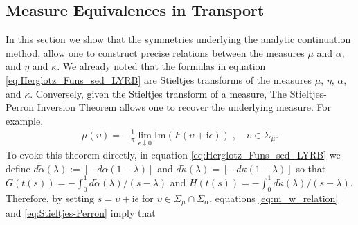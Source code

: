 \documentclass[english,12pt,jmp,graphicx]{revtex4-1}
\newcommand{\I}{\mathrm{i}}
\begin{document}
\subsection{Measure Equivalences in                        
  Transport} \label{sec:Measure_Equivalences}  
%
In this section we show that the symmetries underlying the
analytic continuation method, allow one to construct precise relations
between the measures $\mu$ and $\alpha$, and $\eta$ and $\kappa$. We already noted
that the formulas in equation \eqref{eq:Herglotz_Funs_sed_LYRB} are 
Stieltjes transforms of the measures $\mu$, $\eta$, $\alpha$, and
$\kappa$. Conversely, given the Stieltjes transform of a measure, The 
Stieltjes-Perron Inversion Theorem
\cite{Day:JPCM-96,Henrici:1974:v3,MILTON:2002:TC} allows one to
recover the underlying measure. For example,
%
\begin{align}\label{eq:Stieltjes-Perron}
  \mu(\upsilon)=-\frac{1}{\pi}\lim_{\epsilon\downarrow0}\text{Im}(F(\upsilon+\I\epsilon))\;, \quad
  \upsilon\in\Sigma_\mu. 
\end{align}
%
To evoke this theorem directly, in equation
\eqref{eq:Herglotz_Funs_sed_LYRB} we define 
$d\tilde{\alpha}(\lambda):=[-d\alpha(1-\lambda)]$ and $d\tilde{\kappa}(\lambda)=[-d\kappa(1-\lambda)]$ so that
$G(t(s))=-\int_0^1d\tilde{\alpha}(\lambda)/(s-\lambda)$ and
$H(t(s))=-\int_0^1d\tilde{\kappa}(\lambda)/(s-\lambda)$. Therefore, by setting $s=\upsilon+\I\epsilon$
for $\upsilon\in\Sigma_\mu\cap\Sigma_\alpha$, equations \eqref{eq:m_w_relation} and
\eqref{eq:Stieltjes-Perron} imply that
\end{document}
